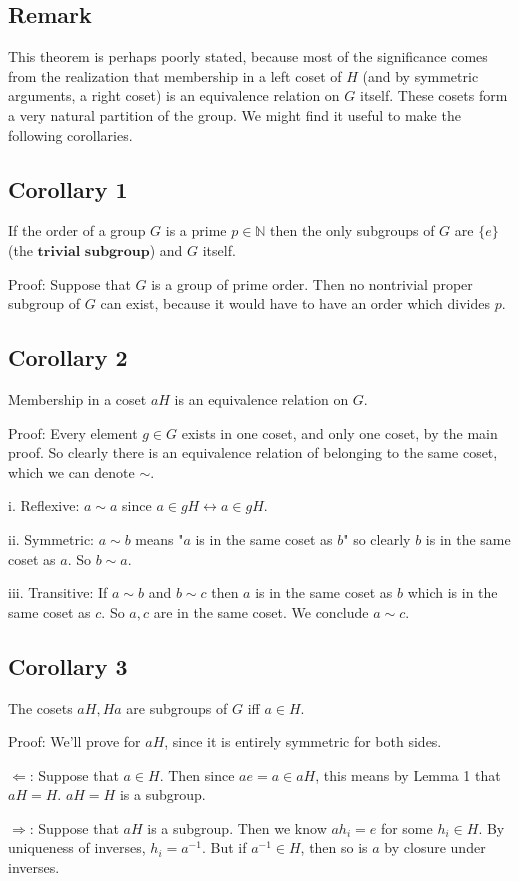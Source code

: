 \documentclass[letterpaper]{article} %
\newcommand{\prob}{\subsection*}
\newcommand{\NN}{\mathbb{N}}
\newcommand{\rarr}{\Rightarrow}
\begin{document}
\prob{Remark} 

This theorem is perhaps poorly stated, because most of the significance comes from the realization that membership in a left coset of $H$ (and by symmetric arguments, a right coset) is an equivalence relation on $G$ itself. These cosets form a very natural partition of the group. We might find it useful to make the following corollaries. 

\prob{Corollary 1} 

If the order of a group $G$ is a prime $p \in \NN$ then the only subgroups of $G$ are $\{e\}$ (the $\textbf{trivial subgroup}$) and $G$ itself. 

Proof: Suppose that $G$ is a group of prime order. Then no nontrivial proper subgroup of $G$ can exist, because it would have to have an order which divides $p$. 

\prob{Corollary 2} 

Membership in a coset $aH$ is an equivalence relation on $G$. 

Proof: Every element $g \in G$ exists in one coset, and only one coset, by the main proof. So clearly there is an equivalence relation of belonging to the same coset, which we can denote $\sim$. 

i. Reflexive: $a \sim a$ since $a \in gH \leftrightarrow a \in gH$.

ii. Symmetric: $a \sim b$ means "$a$ is in the same coset as $b$" so clearly $b$ is in the same coset as $a$. So $b \sim a$. 

iii. Transitive: If $a \sim b$ and $b \sim c$ then $a$ is in the same coset as $b$ which is in the same coset as $c$. So $a, c$ are in the same coset. We conclude $a \sim c$. 

\prob{Corollary 3}

The cosets $aH, Ha$ are subgroups of $G$ iff $a \in H$. 

Proof: We'll prove for $aH$, since it is entirely symmetric for both sides. 

$\Leftarrow$: Suppose that $a \in H$. Then since $ae = a \in aH$, this means by Lemma 1 that $aH = H$. $aH = H$ is a subgroup.

$\rarr$: Suppose that $aH$ is a subgroup. Then we know $ah_{i} = e$ for some $h_i \in H$. By uniqueness of inverses, $h_i = a^{-1}$. But if $a^{-1} \in H$, then so is $a$ by closure under inverses. 
\end{document}

